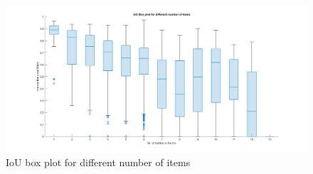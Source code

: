 \begin{figure}[h]
    \centering
    \includegraphics[width=1\textwidth]{graphics/results/boxplotBottles.png}
    \caption{IoU box plot for different number of items}
    \label{fig:bottles}
\end{figure}